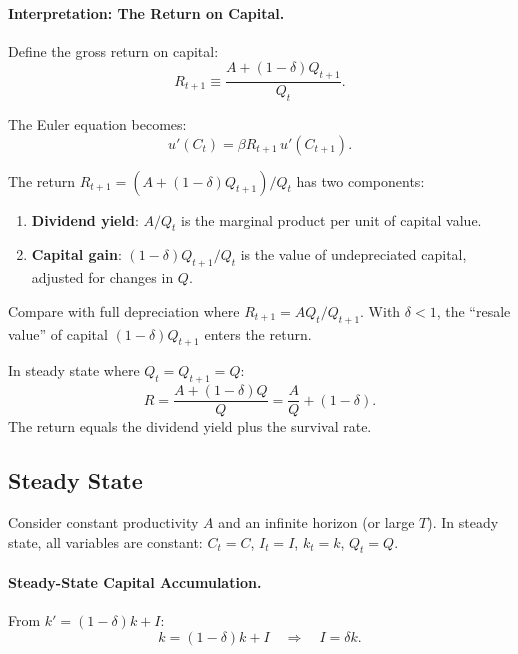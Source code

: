 \paragraph{Interpretation: The Return on Capital.}
Define the gross return on capital:
\begin{equation}
R_{t+1} \equiv \frac{A + (1-\delta) Q_{t+1}}{Q_t}.
\label{eq:ac-dep-return}
\end{equation}

The Euler equation becomes:
\begin{equation}
u'(C_t) = \beta R_{t+1} \, u'(C_{t+1}).
\label{eq:ac-dep-euler-standard}
\end{equation}

\begin{calloutimportant}
The return $R_{t+1} = (A + (1-\delta) Q_{t+1}) / Q_t$ has two components:
\begin{enumerate}[nosep]
\item \textbf{Dividend yield}: $A / Q_t$ is the marginal product per unit of capital value.
\item \textbf{Capital gain}: $(1-\delta) Q_{t+1} / Q_t$ is the value of undepreciated capital, adjusted for changes in $Q$.
\end{enumerate}

Compare with full depreciation where $R_{t+1} = A Q_t / Q_{t+1}$. With $\delta < 1$, the ``resale value'' of capital $(1-\delta) Q_{t+1}$ enters the return.

In steady state where $Q_t = Q_{t+1} = Q$:
\[
R = \frac{A + (1-\delta) Q}{Q} = \frac{A}{Q} + (1-\delta).
\]
The return equals the dividend yield plus the survival rate.
\end{calloutimportant}

\subsection{Steady State}
\label{subsec:ac-dep-steady-state}

Consider constant productivity $A$ and an infinite horizon (or large $T$). In steady state, all variables are constant: $C_t = C$, $I_t = I$, $k_t = k$, $Q_t = Q$.

\paragraph{Steady-State Capital Accumulation.}
From $k' = (1-\delta)k + I$:
\begin{equation}
k = (1-\delta)k + I \quad \Longrightarrow \quad I = \delta k.
\label{eq:ac-dep-ss-accum}
\end{equation}

